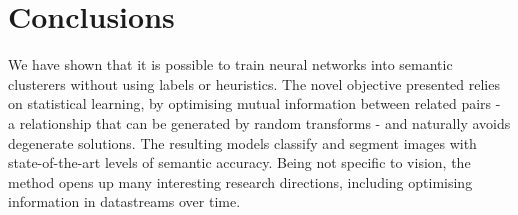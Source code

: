 \section{Conclusions}\label{s:conc}
We have shown that it is possible to train neural networks into semantic clusterers without using labels or heuristics. The novel objective presented relies on statistical learning, by optimising mutual information between related pairs - a relationship that can be generated by random transforms - and naturally avoids degenerate solutions. The resulting models classify and segment images with state-of-the-art levels of semantic accuracy. Being not specific to vision, the method opens up many interesting research directions, including optimising information in datastreams over time. 